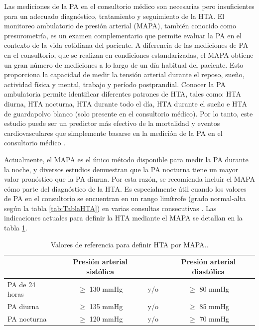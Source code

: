 Las mediciones de la PA en el consultorio médico son necesarias pero insuficientes para un adecuado diagnóstico, 
tratamiento y seguimiento de la HTA. El monitoreo ambulatorio de presión arterial (MAPA), también conocido 
como presurometría, es un examen complementario que permite evaluar la PA en el contexto de la vida cotidiana 
del paciente. A diferencia de las mediciones de PA en el consultorio, que se realizan en condiciones 
estandarizadas, el MAPA obtiene un gran número de mediciones a lo largo de un día habitual del paciente. 
Esto proporciona la capacidad de medir la tensión arterial durante el reposo, sueño, actividad física y mental, 
trabajo y período postprandial. Conocer la PA ambulatoria permite identificar diferentes patrones de HTA, tales 
como: HTA diurna, HTA nocturna, HTA durante todo el día, HTA durante el sueño e HTA de guardapolvo blanco 
(solo presente en el consultorio médico). Por lo tanto, este estudio puede ser un predictor más efectivo de 
la mortalidad y eventos cardiovasculares que simplemente basarse en la medición de la PA en el 
consultorio médico \citep{CITE:7} \citep{CITE:5}.

Actualmente, el MAPA es el único método disponible para medir la PA durante la noche, y diversos estudios 
demuestran que la PA nocturna tiene un mayor valor pronóstico que la PA diurna. Por esta razón, se recomienda 
incluir el MAPA cómo parte del diagnóstico de la HTA. Es especialmente útil cuando los valores de PA en el 
consultorio se encuentran en un rango limítrofe (grado normal-alta según la tabla \ref{tab:TablaHTA}) en 
varias consultas consecutivas \citep{CITE:7}. Las indicaciones actuales para definir la HTA mediante el MAPA se detallan 
en la tabla \ref{tab:HTA-MAPA}.

\begin{table}[h]
	\centering
	\caption[Valores de referencia para definir HTA por MAPA]{Valores de referencia para definir HTA por MAPA.\protect\footnotemark.}
	\begin{tabular}{l c c c}    
		\toprule
		\textbf{} 	      & \textbf{Presión arterial sistólica} 	& \textbf{}	& \textbf{Presión arterial diastólica}  \\
		\midrule
    PA de 24 horas     &  $\geq$ 130 mmHg                     & 	y/o			&  $\geq$ 80 mmHg \\	
    PA diurna          &  $\geq$ 135 mmHg                     & 	y/o			&  $\geq$ 85 mmHg \\	
    PA nocturna        &  $\geq$ 120 mmHg                     & 	y/o			&  $\geq$ 70 mmHg \\	
		\bottomrule
		\hline
	\end{tabular}
	\label{tab:HTA-MAPA}
\end{table}

